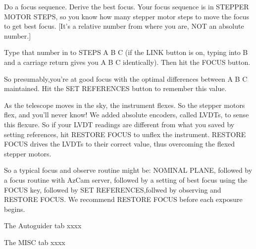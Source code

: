 \documentclass[letterpaper,12pt]{article}
\begin{document}
     Do a focus sequence. Derive the best focus. Your focus
     sequence is in STEPPER MOTOR STEPS, so you know how many
     stepper motor steps to move the focus to get best focus.
     [It's a relative number from where you are, NOT an absolute
      number.]

     Type that number in to STEPS A B C (if the LINK button
     is on, typing into B and a carriage return gives you
     A B C identically). Then hit the FOCUS button.

     So presumably,you're at good focus with the optimal
     differences between A B C maintained. Hit the SET REFERENCES
     button to remember this value.

     As the telescope moves in the sky, the instrument flexes.
     So the stepper motors flex, and you'll never know!
     We added absolute encoders, called LVDTs, to sense
     this flexure. So if your LVDT readings are different
     from what you saved by setting references, hit RESTORE
     FOCUS to unflex the instrument. RESTORE FOCUS drives
     the LVDTs to their correct value, thus overcoming the
     flexed stepper motors.


     So a typical focus and observe routine might be:
     NOMINAL PLANE, followed by a focus routine with AzCam server,
     followed by a setting of best focus using the FOCUS key,
     followed by SET REFERENCES,follwed by observing and 
     RESTORE FOCUS. We recommend RESTORE FOCUS before each
     exposure begins.


The Autoguider tab
xxxx

The MISC tab
xxxx
\end{document}
